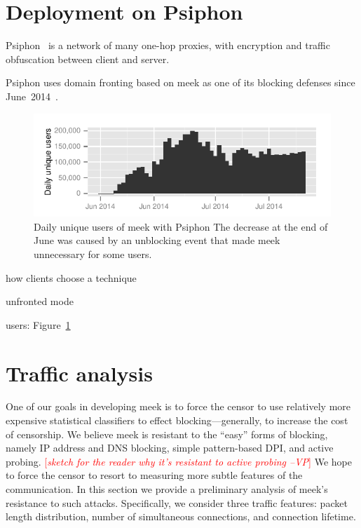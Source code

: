 \documentclass{sig-alternate}
\newcommand{\meekclient}{\mbox{meek-client}\xspace}
\newcommand{\meek}{meek\xspace}
\newcommand{\note}[1]{{\textcolor{red}{[\textit{#1}]}}}
\newcommand{\vp}[1]{\note{#1 --VP}}
\begin{document}
\section{Deployment on Psiphon}
\label{sec:deploy-psiphon}

Psiphon~\cite{psiphon} is a network of many one-hop proxies,
with encryption and traffic obfuscation between client and server.

Psiphon uses domain fronting based on \meek as one of its blocking defenses since June~2014~\cite{psiphon-meek-merge}.

\begin{figure}
\includegraphics[width=\linewidth]{clients-psiphon3}
\caption{
Daily unique users of \meek with
Psiphon
The decrease at the end of June
was caused by an unblocking event that made \meek unnecessary for some users.
}
\label{fig:clients-psiphon3}
\end{figure}

how clients choose a technique

unfronted mode

users: Figure~\ref{fig:clients-psiphon3}



\section{Traffic analysis}
\label{sec:trafficanalysis}

One of our goals in developing \meek is to force
the censor to use relatively more expensive statistical classifiers
to effect blocking---generally, to increase the cost of censorship.
We believe \meek is resistant to the ``easy''
forms of blocking, namely IP address and DNS blocking,
simple pattern-based DPI,
and active probing.
\vp{sketch for the reader why it's resistant to active probing}
We hope to force the censor to resort to measuring
more subtle features of the communication.
In this section we provide a preliminary analysis
of \meek's resistance to such attacks.
Specifically, we consider three traffic features:
packet length distribution,
number of simultaneous connections,
and connection lifetime.
\end{document}
